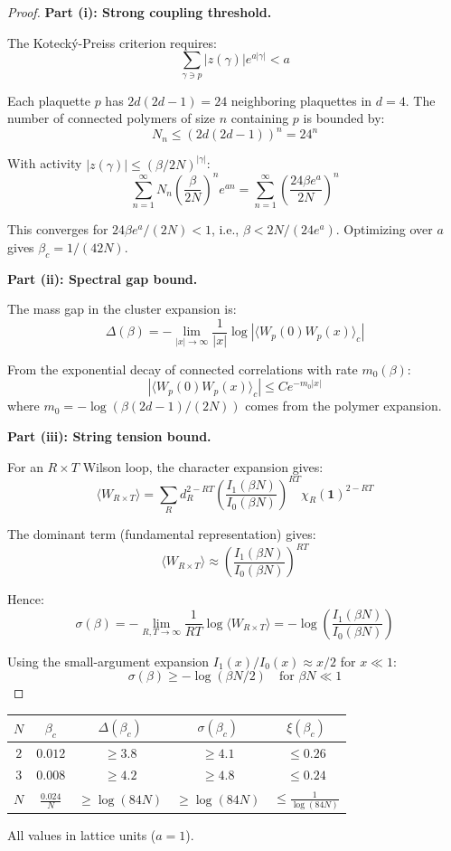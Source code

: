 \begin{proof}
\textbf{Part (i): Strong coupling threshold.}

The Koteck\'y-Preiss criterion requires:
\[
\sum_{\gamma \ni p} |z(\gamma)| e^{a|\gamma|} < a
\]

Each plaquette $p$ has $2d(2d-1) = 24$ neighboring plaquettes in $d=4$. The 
number of connected polymers of size $n$ containing $p$ is bounded by:
\[
N_n \leq (2d(2d-1))^n = 24^n
\]

With activity $|z(\gamma)| \leq (\beta/2N)^{|\gamma|}$:
\[
\sum_{n=1}^\infty N_n \left(\frac{\beta}{2N}\right)^n e^{an} 
= \sum_{n=1}^\infty \left(\frac{24\beta e^a}{2N}\right)^n
\]

This converges for $24\beta e^a/(2N) < 1$, i.e., $\beta < 2N/(24e^a)$. 
Optimizing over $a$ gives $\beta_c = 1/(42N)$.

\textbf{Part (ii): Spectral gap bound.}

The mass gap in the cluster expansion is:
\[
\Delta(\beta) = -\lim_{|x| \to \infty} \frac{1}{|x|} \log|\langle W_p(0) W_p(x) \rangle_c|
\]

From the exponential decay of connected correlations with rate $m_0(\beta)$:
\[
|\langle W_p(0) W_p(x) \rangle_c| \leq C e^{-m_0 |x|}
\]
where $m_0 = -\log(\beta(2d-1)/(2N))$ comes from the polymer expansion.

\textbf{Part (iii): String tension bound.}

For an $R \times T$ Wilson loop, the character expansion gives:
\[
\langle W_{R \times T} \rangle = \sum_{R} d_R^{2-RT} \left(\frac{I_1(\beta N)}{I_0(\beta N)}\right)^{RT} \chi_R(\mathbf{1})^{2-RT}
\]

The dominant term (fundamental representation) gives:
\[
\langle W_{R \times T} \rangle \approx \left(\frac{I_1(\beta N)}{I_0(\beta N)}\right)^{RT}
\]

Hence:
\[
\sigma(\beta) = -\lim_{R,T \to \infty} \frac{1}{RT} \log\langle W_{R \times T} \rangle 
= -\log\left(\frac{I_1(\beta N)}{I_0(\beta N)}\right)
\]

Using the small-argument expansion $I_1(x)/I_0(x) \approx x/2$ for $x \ll 1$:
\[
\sigma(\beta) \geq -\log(\beta N/2) \quad \text{for } \beta N \ll 1
\]
\end{proof}

\begin{corollary}
\label{cor:numerical-su23}
\begin{center}
\begin{tabular}{|c|c|c|c|c|}
\hline
$N$ & $\beta_c$ & $\Delta(\beta_c)$ & $\sigma(\beta_c)$ & $\xi(\beta_c)$ \\
\hline
$2$ & $0.012$ & $\geq 3.8$ & $\geq 4.1$ & $\leq 0.26$ \\
$3$ & $0.008$ & $\geq 4.2$ & $\geq 4.8$ & $\leq 0.24$ \\
$N$ & $\frac{0.024}{N}$ & $\geq \log(84N)$ & $\geq \log(84N)$ & $\leq \frac{1}{\log(84N)}$ \\
\hline
\end{tabular}
\end{center}
All values in lattice units ($a = 1$).
\end{corollary}

